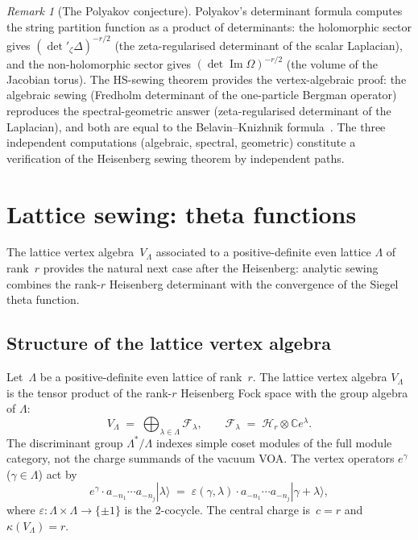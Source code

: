 \documentclass[11pt,reqno]{amsart}
\theoremstyle{definition}
\theoremstyle{remark}
\newtheorem{remark}[theorem]{Remark}
\newcommand{\cF}{\mathcal{F}}
\newcommand{\cH}{\mathcal{H}}
\newcommand{\bC}{\mathbb{C}}
\numberwithin{equation}{section}
\begin{document}
\begin{remark}[The Polyakov conjecture]
\label{rem:polyakov-conjecture}
Polyakov's determinant formula computes the string partition function as a
product of determinants: the holomorphic sector gives
$(\det{}'_\zeta\Delta)^{-r/2}$ (the zeta-regularised
determinant of the scalar Laplacian), and the non-holomorphic
sector gives $(\det\operatorname{Im}\Omega)^{-r/2}$ (the
volume of the Jacobian torus).  The HS-sewing theorem provides
the vertex-algebraic proof: the algebraic sewing
(Fredholm determinant of the one-particle Bergman operator)
reproduces the spectral-geometric answer (zeta-regularised
determinant of the Laplacian), and both are equal to the
Belavin--Knizhnik formula~\cite{BK86}.  The three independent
computations (algebraic, spectral, geometric) constitute a
verification of the Heisenberg sewing theorem by independent
paths.
\end{remark}



\section{Lattice sewing: theta functions}\label{sec:lattice}

The lattice vertex algebra~$V_\Lambda$ associated to a
positive-definite even lattice $\Lambda$ of rank~$r$ provides
the natural next case after the Heisenberg: analytic sewing combines
the rank-$r$ Heisenberg determinant with the convergence of the
Siegel theta function.

\subsection{Structure of the lattice vertex algebra}
\label{subsec:lattice-structure}

Let~$\Lambda$ be a positive-definite even lattice of rank~$r$.
The lattice vertex algebra $V_\Lambda$ is the tensor product of
the rank-$r$ Heisenberg Fock space with the group algebra of
$\Lambda$:
\[
V_\Lambda
\;=\;
\bigoplus_{\lambda \in \Lambda} \cF_\lambda,
\qquad
\cF_\lambda \;=\; \cH_r \otimes \bC e^\lambda .
\]
The discriminant group $\Lambda^*/\Lambda$ indexes simple coset
modules of the full module category, not the charge summands of the
vacuum VOA. The vertex operators $e^\gamma$ ($\gamma \in \Lambda$)
act by
\[
e^\gamma \cdot
a_{-n_1}\cdots a_{-n_j} |\lambda\rangle
\;=\;
\varepsilon(\gamma,\lambda) \cdot
a_{-n_1}\cdots a_{-n_j} |\gamma + \lambda\rangle,
\]
where $\varepsilon \colon \Lambda \times \Lambda \to
\{\pm 1\}$ is the 2-cocycle.  The central charge is~$c = r$
and $\kappa(V_\Lambda) = r$.
\end{document}
